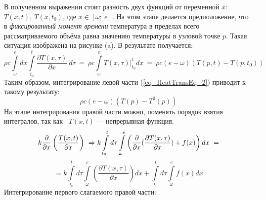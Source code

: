 \documentclass[oneside, final, 14pt]{report}
\begin{document}
\begin{figure}[b!]
 \hfill
 \hfill
 \label{func_profiles}
\end{figure}
В полученном выражении стоит разность двух функций от переменной $x$: $T(x, t), \ T(x, t_0)$, где $x \in [\omega; \ e]$. На этом этапе делается предположение, что в \emph{фиксированный момент времени} температура в пределах всего рассматриваемого объёма равна значению температуры в узловой точке $p$. Такая ситуация изображена на рисунке (a). В результате получается:
\[
\rho c\int\limits_{\omega}^e dx \int\limits_{t_0}^t \frac{\partial T(x,\tau)}{\partial x}\ d\tau 
\ = \
\rho c\int\limits_{\omega}^e T(x,\tau)|_{t_0}^t dx  
\ = \ 
\rho c (e - \omega)\left(T(p, t) - T(p, t_0)\right) 
\]
Таким образом, интегрирование левой части (\ref{eq_HeatTransEq_2}) приводит к такому результату:
\begin{equation}
\rho c (e - \omega)\left(T(p) - T^0(p)\right)
\label{eq_integHeatTransLeft1}
\end{equation}
На этапе интегрирования правой части можно, поменять порядок взятия интегралов, так как ~$T(x, t)$ --- непрерывная функция.
\[ 
k \frac{\partial}{\partial x}\left(\frac{T(x, t)}{\partial x}\right) \ \Rightarrow \\ 
k\int\limits_{t_0}^t d\tau \int\limits_{\omega}^e \left(\frac{\partial}{\partial x}(\frac{\partial T(x,\tau)}{\partial x}) + f(x) \right)dx \ 
= 
\]
\[ = 
k\int\limits_{t_0}^t d\tau \int\limits_{\omega}^e \left(\frac{\partial T(x,\tau)}{\partial x}\right)dx + \int\limits_{t_0}^t d\tau \int\limits_{\omega}^e f(x)dx 
\]
Интегрирование первого слагаемого правой части:
\end{document}
